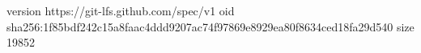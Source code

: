 version https://git-lfs.github.com/spec/v1
oid sha256:1f85bdf242c15a8faac4ddd9207ac74f97869e8929ea80f8634ced18fa29d540
size 19852
